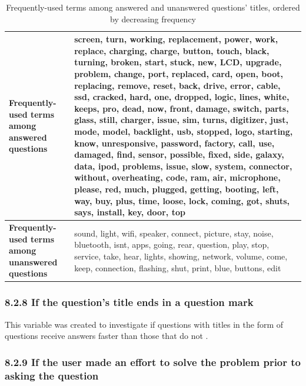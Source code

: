 \documentclass{article}
\begin{document}
\begin{table}[!htbp]
\centering
\begin{tabular}{|L{4cm}|L{8cm}|}
  \hline
 \textbf{Frequently-used terms among answered questions} & screen, turn, working, replacement, power, work, replace, charging, charge, button, touch, black, turning, broken, start, stuck, new, LCD, upgrade, problem, change, port, replaced, card, open, boot, replacing, remove, reset, back, drive, error, cable, ssd, cracked, hard, one, dropped, logic, lines, white, keeps, pro, dead, now, front, damage, switch, parts, glass, still, charger, issue, sim, turns, digitizer, just, mode, model, backlight, usb, stopped, logo, starting, know, unresponsive, password, factory, call, use, damaged, find, sensor, possible, fixed, side, galaxy, data, ipod, problems, issue, slow, system, connector, without, overheating, code, ram, air, microphone, please, red, much, plugged, getting, booting, left, way, buy, plus, time, loose, lock, coming, got, shuts, says, install, key, door, top \\
  \hline
  \textbf{Frequently-used terms among unanswered questions} & sound, light, wifi, speaker, connect, picture, stay, noise, bluetooth, isnt, apps, going, rear, question, play, stop, service, take, hear, lights, showing, network, volume, come, keep, connection, flashing, shut, print, blue, buttons, edit \\ 
   \hline
\end{tabular}
\caption{Frequently-used terms among answered and unanswered questions' titles, ordered by decreasing frequency}
\label{table:frequent_terms}
\end{table}


\subsubsection*{8.2.8 If the question's title ends in a question mark}

This variable was created to investigate if questions with titles in the form of questions receive answers faster than those that do not \cite{Bhat2014}. 


\subsubsection*{8.2.9 If the user made an effort to solve the problem prior to asking the question}
\end{document}
